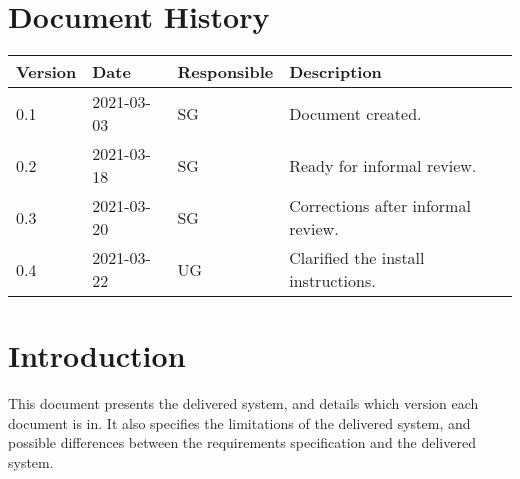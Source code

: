 \documentclass{article}
\date {#1}
\title {
    \documentNumber {01}    
    
    \documentVersion {0.4}
    
    \documentTitle {Template}
    \documentGroup {2}
    
    \documentResponsible {System Group}
    \documentAuthors {System Group}
    
    \documentDate {2021-03-20}
}
\begin{document}
\maketitle
\thispagestyle{empty}

\newpage

\tableofcontents

\newpage



\section{Document History}

\begin{tabular}{ l | l | l | l }
    Version & Date & Responsible & Description \\
    \hline
    0.1 & 2021-03-03 & SG & Document created. \\
    \hline
    0.2 & 2021-03-18 & SG & Ready for informal review. \\
    \hline
    0.3 & 2021-03-20 & SG & Corrections after informal review. \\
    \hline
    0.4 & 2021-03-22 & UG & Clarified the install instructions.
   
\end{tabular}

\section{Introduction}
    This document presents the delivered system, and details which version each document is in. It also specifies the limitations of the delivered system, and possible differences between the requirements specification and the delivered system.
\end{document}
